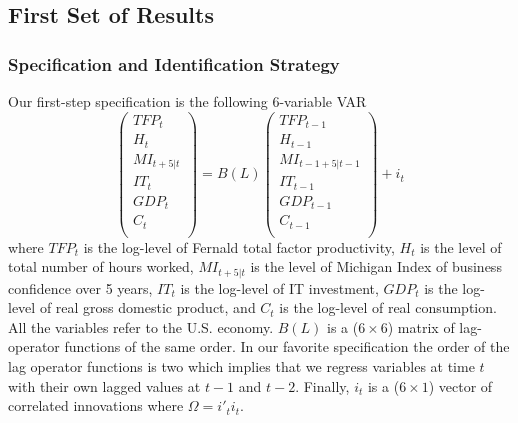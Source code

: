 \documentclass{article}
\begin{document}
\subsection{First Set of Results}

\subsubsection{Specification and Identification Strategy}

Our first-step specification is the following 6-variable VAR 
\begin{equation}
\begin{pmatrix}
TFP_t \\ 
H_t \\
MI_{t+5|t} \\
IT_t \\
GDP_t \\
C_t \\
\end{pmatrix} = B(L) \begin{pmatrix}
TFP_{t-1} \\ 
H_{t-1} \\
MI_{t-1+5|t-1} \\
IT_{t-1} \\
GDP_{t-1} \\
C_{t-1} \\
\end{pmatrix} + i_t
\end{equation}
where $TFP_t$ is the log-level of Fernald total factor productivity, $H_{t}$ is the level of total number of hours worked, $MI_{t+5|t}$ is the level of Michigan Index of business confidence over 5 years, $IT_t$ is the log-level of IT investment, $GDP_t$ is the log-level of real gross domestic product, and $C_t$ is the log-level of real consumption. All the variables refer to the U.S. economy. $B(L)$ is a ($6\times 6$) matrix of lag-operator functions of the same order. In our favorite specification the order of the lag operator functions is two which implies that we regress variables at time $t$ with their own lagged values at $t-1$ and $t-2$. Finally, $i_t$ is a ($6\times 1$) vector of correlated innovations where $\Omega = i'_t i_t$.
\end{document}
